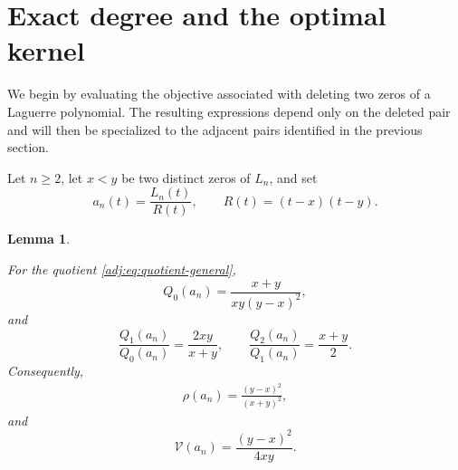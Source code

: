 \documentclass[11pt]{article}
\numberwithin{equation}{section}
\newtheorem{lemma}[theorem]{Lemma}
\theoremstyle{definition}
\theoremstyle{remark}
\newcommand{\Vcal}{\mathcal V}
\newcommand{\Lag}{L}
\begin{document}
\section{Exact degree and the optimal kernel}\label{sec:degree-selection}

We begin by evaluating the objective associated with deleting two zeros of a Laguerre polynomial. The resulting expressions depend only on the deleted pair and will then be specialized to the adjacent pairs identified in the previous section.

Let $n\geq2$, let $x<y$ be two distinct zeros of $\Lag_n$, and set
\begin{equation}\label{adj:eq:quotient-general}
 {a_n}(t)=\frac{\Lag_n(t)}{R(t)},
 \qquad
 R(t)=(t-x)(t-y).
\end{equation}

\begin{lemma}\label{adj:lem:moments}

For the quotient \eqref{adj:eq:quotient-general},
\begin{equation}\label{adj:eq:Q0-pair}
 Q_0({a_n})=\frac{x+y}{xy(y-x)^2},
\end{equation}
and
\begin{equation}\label{adj:eq:moment-ratios}
 \frac{Q_1({a_n})}{Q_0({a_n})}=\frac{2xy}{x+y},
 \qquad
 \frac{Q_2({a_n})}{Q_1({a_n})}=\frac{x+y}{2}.
\end{equation}
Consequently,
\begin{align*}
 \rho({a_n})=\frac{(y-x)^2}{(x+y)^2},
\end{align*}
and
\begin{equation}\label{adj:eq:V-pair}
 \Vcal({a_n})=\frac{(y-x)^2}{4xy}.
\end{equation}

\end{lemma}
\end{document}
